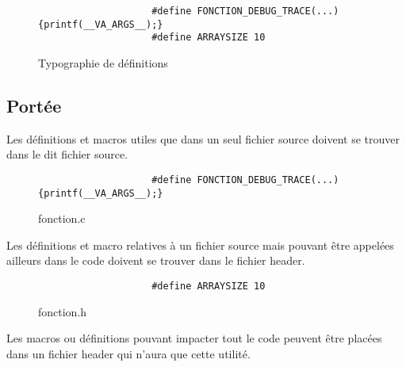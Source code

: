 			\begin{figure}[H]
				\begin{changemargin}{-2.5cm}{-2.5cm}
				\begin{tcolorbox}
				\begin{verbatim}
					#define FONCTION_DEBUG_TRACE(...) {printf(__VA_ARGS__);}
					#define ARRAYSIZE 10
				\end{verbatim}
				\end{tcolorbox}
				\end{changemargin}
				\caption{Typographie de définitions}
			\end{figure}

		\subsection{Portée}
			Les définitions et macros utiles que dans un seul fichier source doivent se trouver dans le dit fichier source.

			\begin{figure}[H]
				\begin{changemargin}{-2.5cm}{-2.5cm}
				\begin{tcolorbox}
				\begin{verbatim}
					#define FONCTION_DEBUG_TRACE(...) {printf(__VA_ARGS__);}
				\end{verbatim}
				\end{tcolorbox}
				\end{changemargin}
				\caption{fonction.c}
			\end{figure}

			Les définitions et macro relatives à un fichier source mais pouvant être appelées ailleurs dans le code doivent se trouver dans le fichier header.

			\begin{figure}[H]
				\begin{changemargin}{-2.5cm}{-2.5cm}
				\begin{tcolorbox}
				\begin{verbatim}
					#define ARRAYSIZE 10
				\end{verbatim}
				\end{tcolorbox}
				\end{changemargin}
				\caption{fonction.h}
			\end{figure}

			Les macros ou définitions pouvant impacter tout le code peuvent être placées dans un fichier header qui n'aura que cette utilité.
			
